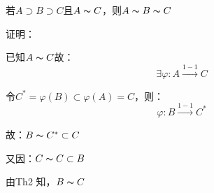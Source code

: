 \begin{la}
    若$A\supset B\supset C$且$A \thicksim C$，则$A\thicksim B\thicksim C$   
\end{la}
\noindent 证明：
\par 已知$A \thicksim C$故：
$$\exists \varphi: A \stackrel{1-1}{\to} C$$
\par 令$C^{*} = \varphi (B) \subset \varphi (A) = C$，则：
$$\varphi: B \stackrel{1-1}{\to} C^{*}$$
\par 故：$B\thicksim C^{*}\subset C$
\par 又因：$C\thicksim C\subset B$
\par 由Th2 \tiny{\pageref{Th2} } \normalsize 知，$B \thicksim C$